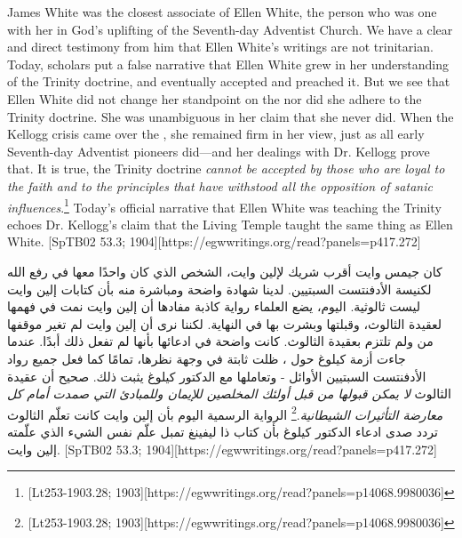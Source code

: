 James White was the closest associate of Ellen White, the person who was one with her in God’s uplifting of the Seventh-day Adventist Church. We have a clear and direct testimony from him that Ellen White’s writings are not trinitarian. Today, scholars put a false narrative that Ellen White grew in her understanding of the Trinity doctrine, and eventually accepted and preached it. But we see that Ellen White did not change her standpoint on the  nor did she adhere to the Trinity doctrine. She was unambiguous in her claim that she never did. When the Kellogg crisis came over the , she remained firm in her view, just as all early Seventh-day Adventist pioneers did—and her dealings with Dr. Kellogg prove that. It is true, the Trinity doctrine \textit{cannot be accepted by those who are loyal to the faith and to the principles that have withstood all the opposition of satanic influences}.\footnote{[Lt253-1903.28; 1903][https://egwwritings.org/read?panels=p14068.9980036]} Today’s official narrative that Ellen White was teaching the Trinity echoes Dr. Kellogg’s claim that the Living Temple taught the same thing as Ellen White. [SpTB02 53.3; 1904][https://egwwritings.org/read?panels=p417.272]


كان جيمس وايت أقرب شريك لإلين وايت، الشخص الذي كان واحدًا معها في رفع الله لكنيسة الأدفنتست السبتيين. لدينا شهادة واضحة ومباشرة منه بأن كتابات إلين وايت ليست ثالوثية. اليوم، يضع العلماء رواية كاذبة مفادها أن إلين وايت نمت في فهمها لعقيدة الثالوث، وقبلتها وبشرت بها في النهاية. لكننا نرى أن إلين وايت لم تغير موقفها من  ولم تلتزم بعقيدة الثالوث. كانت واضحة في ادعائها بأنها لم تفعل ذلك أبدًا. عندما جاءت أزمة كيلوغ حول ، ظلت ثابتة في وجهة نظرها، تمامًا كما فعل جميع رواد الأدفنتست السبتيين الأوائل - وتعاملها مع الدكتور كيلوغ يثبت ذلك. صحيح أن عقيدة الثالوث \textit{لا يمكن قبولها من قبل أولئك المخلصين للإيمان وللمبادئ التي صمدت أمام كل معارضة التأثيرات الشيطانية}.\footnote{[Lt253-1903.28; 1903][https://egwwritings.org/read?panels=p14068.9980036]} الرواية الرسمية اليوم بأن إلين وايت كانت تعلّم الثالوث تردد صدى ادعاء الدكتور كيلوغ بأن كتاب ذا ليفينغ تمبل علّم نفس الشيء الذي علّمته إلين وايت. [SpTB02 53.3; 1904][https://egwwritings.org/read?panels=p417.272]


